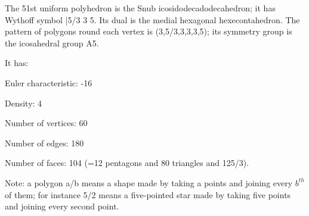 The 51st uniform polyhedron is the Snub icosidodecadodecahedron; it has Wythoff symbol |5/3 3 5. Its dual is the medial hexagonal hexecontahedron. The pattern of polygons round each vertex is (3,5/3,3,3,3,5); its symmetry group is the icosahedral group A5.\par
It has:\par
Euler characteristic: -16\par
Density: 4\par
Number of vertices: 60\par
Number of edges:  180\par
Number of faces: 104 (=12 pentagons and 80 triangles and 12{5/3}).\par
Note: a polygon a/b means a shape made by taking a points and joining every $b^{th}$  of them; for instance 5/2 means a five-pointed star made by taking five points and joining every second point.